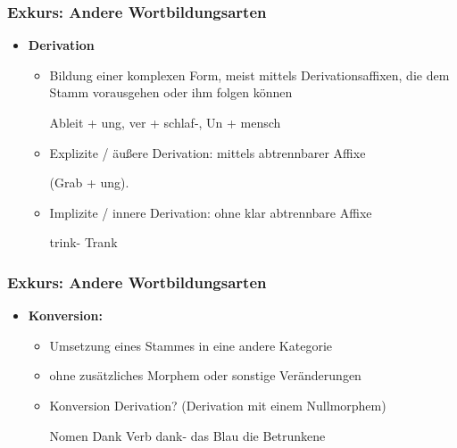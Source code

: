 \begin{frame}
\frametitle{Exkurs: Andere Wortbildungsarten}

\begin{itemize}
\item \textbf{Derivation}

\begin{itemize}
\item Bildung einer komplexen Form, meist mittels Derivationsaffixen, die dem Stamm vorausgehen oder ihm folgen können

\ea Ableit + ung, ver + schlaf-, Un + mensch
\z

\item Explizite / äußere Derivation: mittels abtrennbarer Affixe

\ea (Grab + ung).
\z

\item Implizite / innere Derivation: ohne klar abtrennbare Affixe

\ea trink- \vs Trank
\z

\end{itemize}
\end{itemize}

\end{frame}

\begin{frame}
\frametitle{Exkurs: Andere Wortbildungsarten}

\begin{itemize}
\item \textbf{Konversion:}

\begin{itemize}
\item Umsetzung eines Stammes in eine andere Kategorie
\item ohne zusätzliches Morphem oder sonstige Veränderungen
\item Konversion \ras Derivation? (Derivation mit einem Nullmorphem)

\eal 
\ex Nomen Dank \vs Verb dank-
\ex das Blau
\ex die Betrunkene
\zl

\end{itemize}

\end{itemize}


\end{frame}


